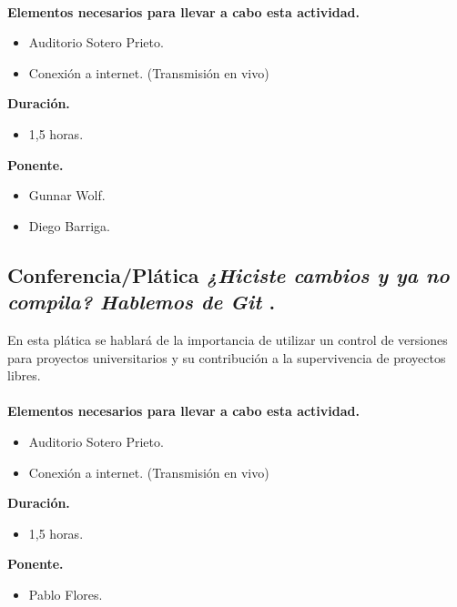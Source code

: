 \documentclass[a4paper,11pt]{article}                 %
\begin{document}
      \paragraph{}
  \textbf{Elementos necesarios para llevar a cabo esta actividad.}
  \begin{itemize}
    \label{list:ddigitales}
    \item Auditorio Sotero Prieto.
    \item Conexión a internet. (Transmisión en vivo)
  \end{itemize}
  
  \textbf{Duración.}
  \begin{itemize}
    \item 1,5 horas.
  \end{itemize}
  
    \textbf{Ponente.}
  \begin{itemize}
    \item Gunnar Wolf.
    \item Diego Barriga.
  \end{itemize}
  

  
  \subsection{Conferencia/Plática  \textit{¿Hiciste cambios y ya no compila? Hablemos de Git} .}                                     %
   En esta plática se hablará de la importancia de utilizar un control de versiones para proyectos universitarios y su contribución a la supervivencia de proyectos libres.
      \paragraph{}
  \textbf{Elementos necesarios para llevar a cabo esta actividad.}
  \begin{itemize}
    \label{list:github}
    \item Auditorio Sotero Prieto.
        \item Conexión a internet. (Transmisión en vivo)
  \end{itemize}
  
  \textbf{Duración.}
  \begin{itemize}
    \item 1,5 horas.
  \end{itemize}
  
        \textbf{Ponente.}
  \begin{itemize}
    \item Pablo Flores.
  \end{itemize}
  
\end{document}
